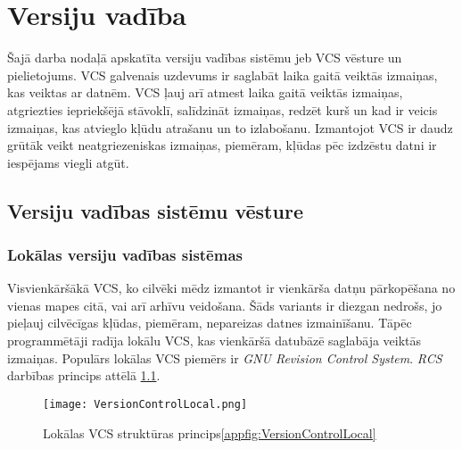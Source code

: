 \chapter{Versiju vadība}


Šajā darba nodaļā apskatīta versiju vadības sistēmu jeb VCS vēsture un pielietojums. VCS galvenais uzdevums ir saglabāt laika gaitā veiktās izmaiņas, kas veiktas ar datnēm. VCS ļauj arī atmest laika gaitā veiktās izmaiņas, atgriezties iepriekšējā stāvoklī, salīdzināt izmaiņas, redzēt kurš un kad ir veicis izmaiņas, kas atvieglo kļūdu atrašanu un to izlabošanu. Izmantojot VCS ir daudz grūtāk veikt neatgriezeniskas izmaiņas, piemēram, kļūdas pēc izdzēstu datni ir iespējams viegli atgūt.

\section{Versiju vadības sistēmu vēsture}
\cite[chapter, p.~27]{chacon2014progit}
\subsection{Lokālas versiju vadības sistēmas}
Visvienkāršākā VCS, ko cilvēki mēdz izmantot ir vienkārša datņu pārkopēšana no vienas mapes citā, vai arī arhīvu veidošana. Šāds variants ir diezgan nedrošs, jo pieļauj cilvēcīgas kļūdas, piemēram, nepareizas datnes izmainīšanu. Tāpēc programmētāji radīja lokālu VCS, kas vienkāršā datubāzē saglabāja veiktās izmaiņas. Populārs lokālas VCS piemērs ir \textit{GNU Revision Control System}. \textit{RCS} darbības princips attēlā \ref{fig:VersionControlLocal}.
\begin{figure}[H]%
	\centering
	\captionsetup{justification=centering}
	\texttt{[image: VersionControlLocal.png]}
	\caption{Lokālas VCS struktūras princips\ref{appfig:VersionControlLocal}}
	\label{fig:VersionControlLocal}
\end{figure}

